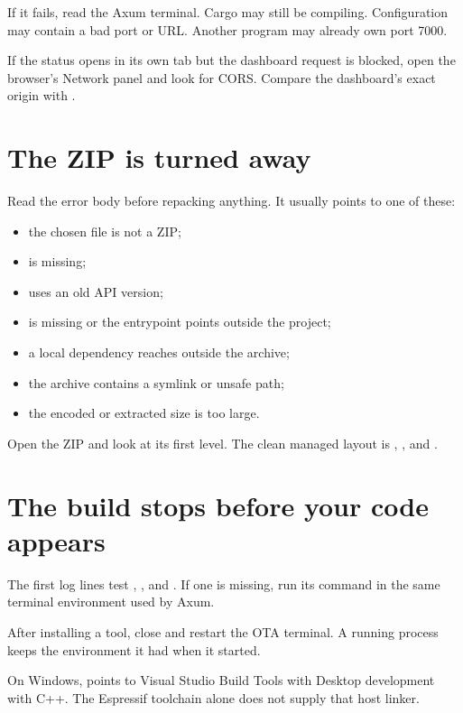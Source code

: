 If it fails, read the Axum terminal. Cargo may still be compiling. Configuration may contain a bad port or URL. Another program may already own port 7000.

If the status opens in its own tab but the dashboard request is blocked, open the browser's Network panel and look for CORS. Compare the dashboard's exact origin with .

\section{The ZIP is turned away}

Read the error body before repacking anything. It usually points to one of these:

\begin{itemize}
  \item the chosen file is not a ZIP;
  \item {} is missing;
  \item {} uses an old API version;
  \item {} is missing or the entrypoint points outside the project;
  \item a local dependency reaches outside the archive;
  \item the archive contains a symlink or unsafe path;
  \item the encoded or extracted size is too large.
\end{itemize}

Open the ZIP and look at its first level. The clean managed layout is , , and .

\section{The build stops before your code appears}

The first log lines test , , and . If one is missing, run its  command in the same terminal environment used by Axum.

After installing a tool, close and restart the OTA terminal. A running process keeps the environment it had when it started.

On Windows,  points to Visual Studio Build Tools with Desktop development with C++. The Espressif toolchain alone does not supply that host linker.

